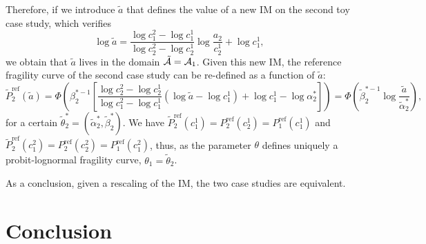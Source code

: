         Therefore, if we introduce $\tilde a$ that defines the value of a new IM on the second toy case study, which verifies
        \begin{equation}
            \log\tilde a = \frac{\log c_1^2-\log c_1^1}{\log c_2^2-\log c_2^1}\log\frac{a_2}{c_2^1} + \log c_1^1,
        \end{equation}
        we obtain that $\tilde a$ lives in the domain $\tilde{\mathcal{A}}=\mathcal{A}_1$. Given this new IM, the reference fragility curve of the second case study can be re-defined as a function of $\tilde a$:
            \begin{equation}
                \tilde P^{\mathrm{ref}}_2(\tilde a) = \Phi\left(\beta^{\ast-1}_2\left[\frac{\log c_2^2-\log c_2^1}{\log c_1^2-\log c_1^1}\left(\log\tilde a-\log c_1^1\right)+\log c_1^1-\log\alpha^\ast_2 \right]\right) = \Phi\left(\tilde\beta^{\ast-1}_2\log\frac{\tilde a}{\tilde\alpha^\ast_2}\right),
            \end{equation}
        for a certain $\tilde\theta^\ast_2 = (\tilde\alpha_2^\ast,\tilde\beta_2^\ast)$.
        We have $\tilde P^{\mathrm{ref}}_2(c_1^1)=P^{\mathrm{ref}}_2(c_2^1)=P^{\mathrm{ref}}_1(c_1^1)$ and $\tilde P^{\mathrm{ref}}_2(c_1^2)=P^{\mathrm{ref}}_2(c_2^2)=P^{\mathrm{ref}}_1(c_1^2)$, thus, as the parameter $\theta$ defines uniquely a probit-lognormal fragility curve, $\theta_1=\tilde\theta_2$.
    
        As a conclusion, given a rescaling of the IM, the two case studies are equivalent.
    
        
    






\section{Conclusion}\label{sec:doe:conclusion}





